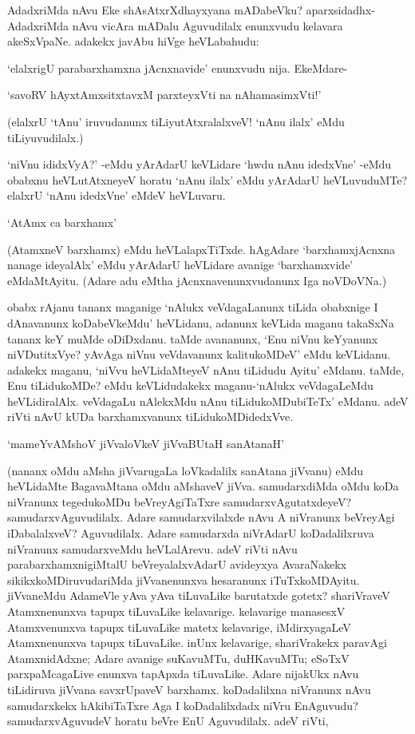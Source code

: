 AdadxriMda nAvu Eke shAsAtxrXdhayxyana mADabeVku? aparxsidadhx-AdadxriMda nAvu vicAra mADalu Aguvudilalx enunxvudu kelavara akeSxVpaNe. adakekx javAbu hiVge heVLabahudu:

`elalxrigU parabarxhamxna jAcnxnavide' enunxvudu nija. EkeMdare-

\begin{shloka}
`savoRV hAyxtAmxsitxtavxM parxteyxVti na nAhamasimxVti!'
\end{shloka}

(elalxrU `tAnu' iruvudanunx tiLiyutAtxralalxveV! `nAnu ilalx' eMdu tiLiyuvudilalx.)

`niVnu ididxVyA?' -eMdu yArAdarU keVLidare `hwdu nAnu idedxVne' -eMdu obabxnu heVLutAtxneyeV horatu `nAnu ilalx' eMdu yArAdarU heVLuvuduMTe? elalxrU `nAnu idedxVne' eMdeV heVLuvaru.

\begin{shloka}
`AtAmx ca barxhamx'
\end{shloka}

(AtamxneV barxhamx) eMdu heVLalapxTiTxde. hAgAdare `barxhamxjAcnxna nanage ideyalAlx' eMdu yArAdarU heVLidare avanige `barxhamxvide' eMdaMtAyitu. (Adare adu eMtha jAcnxnavenunxvudanunx Iga noVDoVNa.)

obabx rAjanu tananx maganige `nAlukx veVdagaLanunx tiLida obabxnige I dAnavanunx koDabeVkeMdu' heVLidanu, adanunx keVLida maganu takaSxNa tananx keY muMde oDiDxdanu. taMde avananunx, `Enu niVnu keYyanunx niVDutitxVye? yAvAga niVnu veVdavanunx kalitukoMDeV' eMdu keVLidanu. adakekx maganu, `niVvu heVLidaMteyeV nAnu tiLidudu Ayitu' eMdanu. taMde, Enu tiLidukoMDe? eMdu keVLidudakekx maganu-`nAlukx veVdagaLeMdu heVLidiralAlx. veVdagaLu nAlekxMdu nAnu tiLidukoMDubiTeTx' eMdanu. adeV riVti nAvU kUDa barxhamxvanunx tiLidukoMDidedxVve.

\begin{shloka}
`mameYvAMshoV jiVvaloVkeV jiVvaBUtaH sanAtanaH'
\end{shloka}

(nananx oMdu aMsha jiVvarugaLa loVkadalilx sanAtana jiVvanu) eMdu heVLidaMte BagavaMtana oMdu aMshaveV jiVva. samudarxdiMda oMdu koDa niVranunx tegedukoMDu beVreyAgiTaTxre samudarxvAgutatxdeyeV? samudarxvAguvudilalx. Adare samudarxvilalxde nAvu A niVranunx beVreyAgi iDabalalxveV? Aguvudilalx. Adare samudarxda niVrAdarU koDadalilxruva niVranunx samudarxveMdu heVLalArevu. adeV riVti nAvu parabarxhamxnigiMtalU beVreyalalxvAdarU avideyxya AvaraNakekx sikikxkoMDiruvudariMda jiVvanenunxva hesaranunx iTuTxkoMDAyitu. jiVvaneMdu AdameVle yAva yAva tiLuvaLike barutatxde gotetx? shariVraveV Atamxnenunxva tapupx tiLuvaLike kelavarige. kelavarige manasesxV Atamxvenunxva tapupx tiLuvaLike matetx kelavarige, iMdirxyagaLeV Atamxnenunxva tapupx tiLuvaLike. inUnx kelavarige, shariVrakekx paravAgi AtamxnidAdxne; Adare avanige suKavuMTu, duHKavuMTu; eSoTxV parxpaMcagaLive enunxva tapApxda tiLuvaLike. Adare nijakUkx nAvu tiLidiruva jiVvana savxrUpaveV barxhamx. koDadalilxna niVranunx nAvu samudarxkekx hAkibiTaTxre Aga I koDadalilxdadx niVru EnAguvudu? samudarxvAguvudeV horatu beVre EnU Aguvudilalx. adeV riVti,

